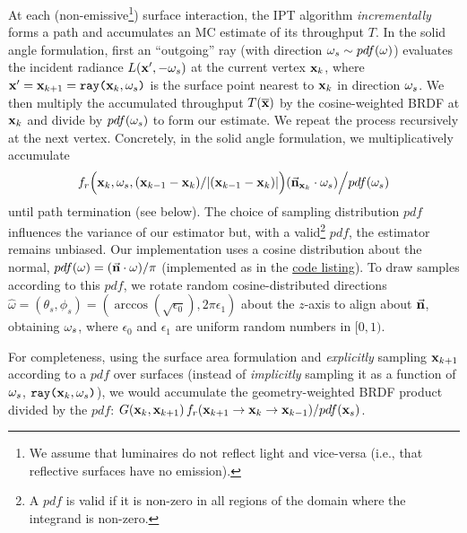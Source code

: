 %
\pagebreak %
%
%
\noindent At each (non-emissive\footnote{We assume that luminaires do not reflect light and vice-versa (i.e., that reflective surfaces have no emission).}) surface interaction, the IPT algorithm \textit{incrementally} forms a path and accumulates an MC estimate of its throughput $T$. In the solid angle formulation, first an ``outgoing'' ray (with direction $\mathbf{\omega}_{s} \sim pdf(\omega)$) evaluates the incident radiance $L(\mathbf{x}',-\mathbf{\omega}_{s})$ at the current vertex $\mathbf{x}_k$, where $\mathbf{x}' = \mathbf{x}_{k+1} = \texttt{ray(}\mathbf{x}_k,\mathbf{\omega}_{s}\texttt{)}$ is the surface point nearest to $\mathbf{x}_k$ in direction $\mathbf{\omega}_{s}$. We then multiply the accumulated throughput $T(\overline{\mathbf{x}})$ by the cosine-weighted BRDF at $\mathbf{x}_k$ and divide by $pdf(\mathbf{\omega}_{s})$ to form our estimate. We repeat the process recursively at the next vertex. Concretely, in the solid angle formulation, we multiplicatively accumulate
%
\begin{align}
f_r \Big( \mathbf{x}_k, \mathbf{\omega}_{s}, (\mathbf{x}_{k-1} - \mathbf{x}_k) / |(\mathbf{x}_{k-1} - \mathbf{x}_k)| \Big)  (\vec{\mathbf{n}}_{\mathbf{x}_k} \cdot \mathbf{\omega}_{s}) \Big/ pdf(\mathbf{\omega}_{s})
\end{align}
%
until path termination (see below). The choice of sampling distribution $pdf$ influences the variance of our estimator but, with a valid\footnote{A $pdf$ is valid if it is non-zero in all regions of the domain where the integrand is non-zero.} $pdf$, the estimator remains unbiased. Our implementation uses a cosine distribution about the normal, $pdf(\omega) = (\vec{\mathbf{n}} \cdot \omega) / \pi$ (implemented as \code{\textcolor{myred}{sampleCosine}} in the \hyperref[lst:IPTpseudocode]{code listing}). To draw samples according to this $pdf$, we rotate random cosine-distributed directions $\widehat{\omega} = (\theta_s,\phi_s) = (\arccos({\sqrt{\epsilon_0}}), 2\pi\epsilon_1)$ about the $z$-axis to align about $\vec{\mathbf{n}}$, obtaining $\mathbf{\omega}_{s}$, where $\epsilon_0$ and $\epsilon_1$ are uniform random numbers in $[0,1)$.
%
\newline
%

\vspace{-13pt}
\noindent For completeness, using the surface area formulation and \textit{explicitly} sampling $\mathbf{x}_{k+1}$ according to a $pdf$ over surfaces (instead of \textit{implicitly} sampling it as a function of $\mathbf{\omega}_{s}$, $\texttt{ray(}\mathbf{x}_k,\mathbf{\omega}_{s}\texttt{)}$), we would accumulate the geometry-weighted BRDF product divided by the $pdf$: $G( \mathbf{x}_k , \mathbf{x}_{k+1}) \, f_r(\mathbf{x}_{k+1} \rightarrow \mathbf{x}_k \rightarrow \mathbf{x}_{k-1})  / pdf(\mathbf{x}_s)$.\\[-10pt]
%
\newline
%

